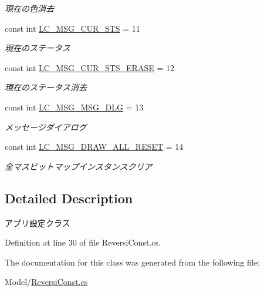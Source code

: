 \begin{DoxyCompactItemize}
\begin{DoxyCompactList}\small\item\em 現在の色消去 \end{DoxyCompactList}\item 
const int \hyperlink{class_reversi4color_wpf_1_1_reversi_const_aa5e7a5251f98091bd63a66c3fb60c123}{L\+C\+\_\+\+M\+S\+G\+\_\+\+C\+U\+R\+\_\+\+S\+TS} = 11\hypertarget{class_reversi4color_wpf_1_1_reversi_const_aa5e7a5251f98091bd63a66c3fb60c123}{}\label{class_reversi4color_wpf_1_1_reversi_const_aa5e7a5251f98091bd63a66c3fb60c123}

\begin{DoxyCompactList}\small\item\em 現在のステータス \end{DoxyCompactList}\item 
const int \hyperlink{class_reversi4color_wpf_1_1_reversi_const_aac37eb9ae2395498de5e0022efb62641}{L\+C\+\_\+\+M\+S\+G\+\_\+\+C\+U\+R\+\_\+\+S\+T\+S\+\_\+\+E\+R\+A\+SE} = 12\hypertarget{class_reversi4color_wpf_1_1_reversi_const_aac37eb9ae2395498de5e0022efb62641}{}\label{class_reversi4color_wpf_1_1_reversi_const_aac37eb9ae2395498de5e0022efb62641}

\begin{DoxyCompactList}\small\item\em 現在のステータス消去 \end{DoxyCompactList}\item 
const int \hyperlink{class_reversi4color_wpf_1_1_reversi_const_a7cc51ce8f936f69e2da29c5e1a84c851}{L\+C\+\_\+\+M\+S\+G\+\_\+\+M\+S\+G\+\_\+\+D\+LG} = 13\hypertarget{class_reversi4color_wpf_1_1_reversi_const_a7cc51ce8f936f69e2da29c5e1a84c851}{}\label{class_reversi4color_wpf_1_1_reversi_const_a7cc51ce8f936f69e2da29c5e1a84c851}

\begin{DoxyCompactList}\small\item\em メッセージダイアログ \end{DoxyCompactList}\item 
const int \hyperlink{class_reversi4color_wpf_1_1_reversi_const_ac4ac73a6528f9fe62acb0b2f17d5777b}{L\+C\+\_\+\+M\+S\+G\+\_\+\+D\+R\+A\+W\+\_\+\+A\+L\+L\+\_\+\+R\+E\+S\+ET} = 14\hypertarget{class_reversi4color_wpf_1_1_reversi_const_ac4ac73a6528f9fe62acb0b2f17d5777b}{}\label{class_reversi4color_wpf_1_1_reversi_const_ac4ac73a6528f9fe62acb0b2f17d5777b}

\begin{DoxyCompactList}\small\item\em 全マスビットマップインスタンスクリア \end{DoxyCompactList}\end{DoxyCompactItemize}


\subsection{Detailed Description}
アプリ設定クラス 

Definition at line 30 of file Reversi\+Const.\+cs.



The documentation for this class was generated from the following file\+:\begin{DoxyCompactItemize}
\item 
Model/\hyperlink{_reversi_const_8cs}{Reversi\+Const.\+cs}\end{DoxyCompactItemize}
